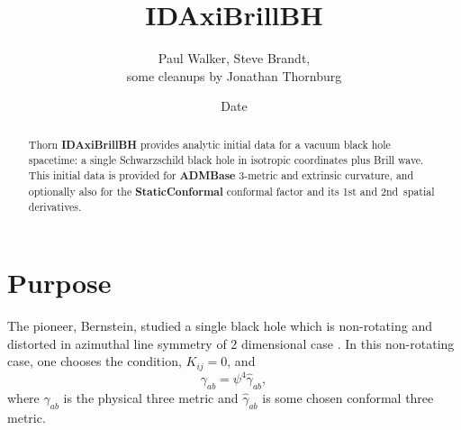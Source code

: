 \documentclass{article}
\begin{document}
\title{IDAxiBrillBH}
\author{Paul Walker, Steve Brandt,\\some cleanups by Jonathan Thornburg}
\date{$ $Date$ $}

\maketitle



\def\thorn#1{\textbf{#1}}
\def\arrangement#1{\textbf{#1}}


\begin{abstract}
  Thorn \thorn{IDAxiBrillBH} provides analytic initial data for a vacuum
  black hole spacetime:  a single Schwarzschild black hole in
  isotropic coordinates plus Brill wave.  This initial data is
  provided for \thorn{ADMBase} 3-metric and extrinsic curvature,
  and optionally also for the \thorn{StaticConformal} conformal
  factor and its 1st and 2nd~spatial derivatives.
\end{abstract}


\section{Purpose}

The pioneer, Bernstein, studied a single black hole which is
non-rotating and distorted in azimuthal line symmetry of 2 dimensional 
case \cite{Bernstein93a}. In this non-rotating case, one chooses the
condition, $K_{ij} = 0$,  and 
\begin{equation}
\gamma_{ab} = \psi^4 \hat \gamma_{ab},
\end{equation}
where $\gamma_{ab}$ is the physical three metric and
$\hat{\gamma}_{ab}$ is some chosen conformal three metric.
\end{document}
